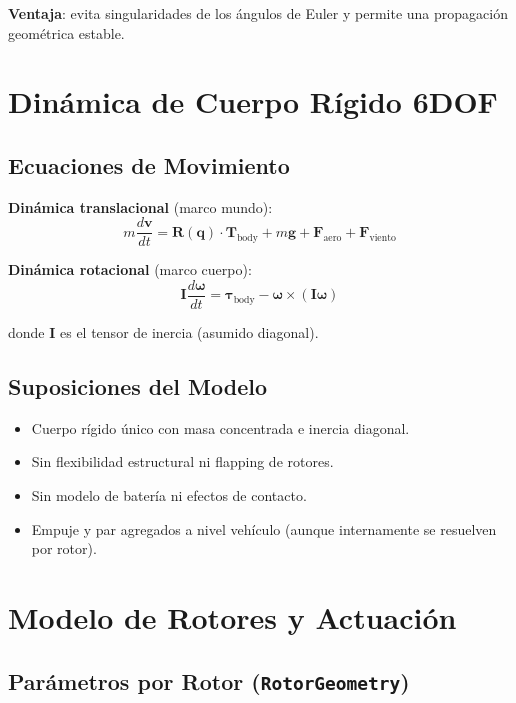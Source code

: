\documentclass[12pt,a4paper]{article}
\begin{document}
\textbf{Ventaja}: evita singularidades de los ángulos de Euler y permite una propagación geométrica estable.

\section{Dinámica de Cuerpo Rígido 6DOF}

\subsection{Ecuaciones de Movimiento}

\textbf{Dinámica translacional} (marco mundo):
\begin{equation}
    m \frac{d\mathbf{v}}{dt} = \mathbf{R}(\mathbf{q}) \cdot \mathbf{T}_{\text{body}} + m\mathbf{g} + \mathbf{F}_{\text{aero}} + \mathbf{F}_{\text{viento}}
\end{equation}

\textbf{Dinámica rotacional} (marco cuerpo):
\begin{equation}
    \mathbf{I} \frac{d\boldsymbol{\omega}}{dt} = \boldsymbol{\tau}_{\text{body}} - \boldsymbol{\omega} \times (\mathbf{I} \boldsymbol{\omega})
\end{equation}

donde $\mathbf{I}$ es el tensor de inercia (asumido diagonal).

\subsection{Suposiciones del Modelo}

\begin{itemize}
    \item Cuerpo rígido único con masa concentrada e inercia diagonal.
    \item Sin flexibilidad estructural ni flapping de rotores.
    \item Sin modelo de batería ni efectos de contacto.
    \item Empuje y par agregados a nivel vehículo (aunque internamente se resuelven por rotor).
\end{itemize}

\section{Modelo de Rotores y Actuación}

\subsection{Parámetros por Rotor (\texttt{RotorGeometry})}
\end{document}
